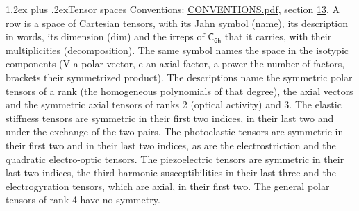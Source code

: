 \documentclass[10pt,a4paper]{article}
\makeatletter
\renewcommand\section{\@startsection{section}{1}{\z@}{-3ex plus -1ex minus -.2ex}%
  {1.2ex plus .2ex}{\normalfont\large\sffamily\bfseries\color{parttitle}}}
\numberwithin{equation}{section}
\newcommand{\grp}[1]{\mathsf{#1}}
\makeatother
\begin{document}
\section{Tensor spaces}\label{s:tensor_spaces}
Conventions: \href{../../CONVENTIONS.pdf}{CONVENTIONS.pdf}, section \href{../../CONVENTIONS.pdf\#conv.13}{13}.
\leavevmode\label{n:head.name}\label{n:head.description}\label{n:head.dim}\label{n:head.decomposition}A row is a space of Cartesian tensors, with its Jahn symbol (name), its description in words, its dimension (dim) and the irreps of $\grp{C_{6h}}$ that it carries, with their multiplicities (decomposition). \label{n:label.jahn}The same symbol names the space in the isotypic components (V a polar vector, e an axial factor, a power the number of factors, brackets their symmetrized product). The descriptions name the symmetric polar tensors of a rank (the homogeneous polynomials of that degree), the axial vectors and the symmetric axial tensors of ranks 2 (optical activity) and 3. The elastic stiffness tensors are symmetric in their first two indices, in their last two and under the exchange of the two pairs. The photoelastic tensors are symmetric in their first two and in their last two indices, as are the electrostriction and the quadratic electro-optic tensors. The piezoelectric tensors are symmetric in their last two indices, the third-harmonic susceptibilities in their last three and the electrogyration tensors, which are axial, in their first two. The general polar tensors of rank 4 have no symmetry.
\end{document}
